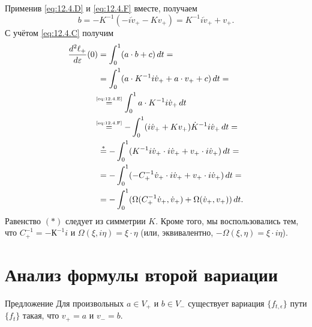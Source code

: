 Применив \ref{eq:12.4.D} и \ref{eq:12.4.F} вместе, получаем
\[b=-K^{-1}(-i\dot v_+ - K v_+) = K^{-1}i\dot v_+ + v_+.\]
С учётом \ref{eq:12.4.C} получим
\begin{align*}
\frac{d^2\ell_+}{d\varepsilon}(0)
&=
\int_0^1(a\cdot b+c)\,d t=
\\
&=\int_0^1(a\cdot K^{-1}i\dot v_++a\cdot v_++c)\,d t=
\\
&\!\!\!\stackrel{\text{\tiny \ref{eq:12.4.E}}}{=}\int_0^1 a\cdot K^{-1}i\dot v_+\,d t
\\
&\!\!\!\stackrel{\text{\tiny \ref{eq:12.4.F}}}{=}-\int_0^1(i\dot v_++Kv_+)\dot K^{-1}i\dot v_+\,d t=
\\
&\stackrel{{*}}{=}-\int_0^1(K^{-1}i\dot v_+\cdot i\dot v_+ +v_+\cdot i\dot v_+)\,d t=
\\
&=-\int_0^1(-C_+^{-1}\dot v_+\cdot i\dot v_++v_+\cdot i\dot v_+)\,d t=
\\
&=-\int_0^1(\Omega(C_+^{-1}\dot v_+,\dot v_+)+\Omega(\dot v_+,v_+))\,d t.
\end{align*}
Равенство $({*})$ следует из симметрии $K$.
Кроме того, мы воспользовались тем, что $C_+^{-1} = -К^{-1} i$ и $\Omega(\xi, i\eta) = \xi\cdot \eta$
(или, эквивалентно, $-\Omega(\xi, \eta) = \xi\cdot i\eta$).
\qeds

\section{Анализ формулы второй вариации}\label{sec:12.5}

\begin{thm}{Предложение}\label{12.5.A}
Для произвольных $a \in V_+$ и $b \in V_-$ существует вариация $\{f_{t,\epsilon}\}$ пути $\{f_t\}$ такая, что $v_+ = a$ и $v_- = b$.
\end{thm}

